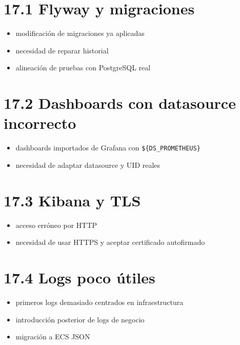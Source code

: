 \documentclass[
a4paper,
12pt]{report}
\providecommand{\tightlist}{%
  \setlength{\itemsep}{0pt}\setlength{\parskip}{0pt}}
\begin{document}
\section{17.1 Flyway y migraciones}\label{flyway-y-migraciones}

\begin{itemize}
\tightlist
\item
  modificación de migraciones ya aplicadas
\item
  necesidad de reparar historial
\item
  alineación de pruebas con PostgreSQL real
\end{itemize}

\section{17.2 Dashboards con datasource
incorrecto}\label{dashboards-con-datasource-incorrecto}

\begin{itemize}
\tightlist
\item
  dashboards importados de Grafana con \texttt{\$\{DS\_PROMETHEUS\}}
\item
  necesidad de adaptar datasource y UID reales
\end{itemize}

\section{17.3 Kibana y TLS}\label{kibana-y-tls}

\begin{itemize}
\tightlist
\item
  acceso erróneo por HTTP
\item
  necesidad de usar HTTPS y aceptar certificado autofirmado
\end{itemize}

\section{17.4 Logs poco útiles}\label{logs-poco-uxfatiles}

\begin{itemize}
\tightlist
\item
  primeros logs demasiado centrados en infraestructura
\item
  introducción posterior de logs de negocio
\item
  migración a ECS JSON
\end{itemize}
\end{document}
